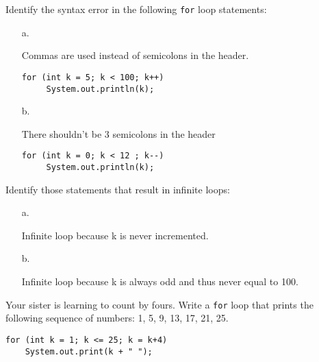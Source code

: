 \pagebreak
\secANSH
\begin{ANS}
\item  Identify the syntax error in the following {\tt for} loop statements:
\begin{enumerate}

\item[a.]

Commas are used instead of semicolons in the header.
\begin{jjjlisting}
\begin{lstlisting}[basicstyle=\scriptsize]
 for (int k = 5; k < 100; k++)
     System.out.println(k);
\end{lstlisting}
\end{jjjlisting}

\item[b.]

There shouldn't be 3 semicolons in the header
\begin{jjjlisting}
\begin{lstlisting}[basicstyle=\scriptsize]
 for (int k = 0; k < 12 ; k--)
     System.out.println(k);
\end{lstlisting}
\end{jjjlisting}

\end{enumerate}


\item  Identify those statements that result in infinite loops:
\begin{enumerate}

\item[a.]

Infinite loop because k is never incremented.


\item[b.]

Infinite loop because k is always odd and thus never equal to 100.

\end{enumerate}

\item  Your sister is learning to count by fours. Write
a {\tt for} loop that prints the following sequence of numbers: 1, 5, 9, 13,
17, 21, 25.

\begin{jjjlisting}
\begin{lstlisting}[basicstyle=\scriptsize]
for (int k = 1; k <= 25; k = k+4)
    System.out.print(k + " ");
\end{lstlisting}
\end{jjjlisting}


\end{ANS}
